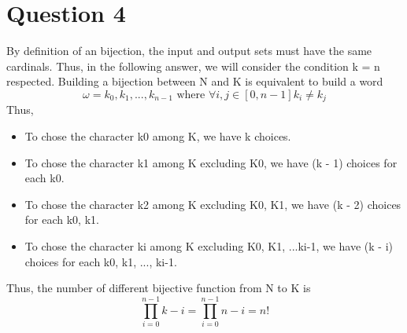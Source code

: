 \documentclass[a4paper,10pt]{article}
\begin{document}
\section{Question 4}
    By definition of an bijection, the input and output sets must have the same cardinals.  Thus, in the following answer, we will consider the condition k = n respected.\newline
    Building a bijection between N and K is equivalent to build a word
    \begin{equation} \omega = k_{0}, k_{1}, ... , k_{n-1} \mbox{ where } \forall i, j \in [0, n-1] k_{i} \ne k_{j}\end{equation}
    Thus,
    \begin{itemize}
     \item To chose the character k0 among K, we have k choices.
     \item To chose the character k1 among K excluding {K0}, we have (k - 1) choices for each k0.
     \item To chose the character k2 among K excluding {K0, K1}, we have (k - 2) choices for each k0, k1.
     \item To chose the character ki among K excluding {K0, K1, ...ki-1}, we have (k - i) choices for each k0, k1, ..., ki-1.
    \end{itemize}

    Thus, the number of different bijective function from N to K is
    \begin{equation} \prod_{i=0}^{n-1} {k - i} = \prod_{i=0}^{n-1} {n - i} = n!\end{equation}
\end{document}
